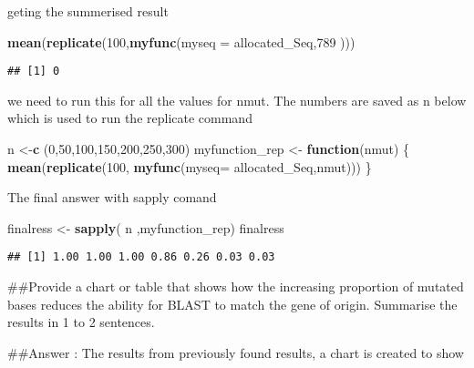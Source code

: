 \documentclass[]{article}
\newenvironment{Shaded}{\begin{snugshade}}{\end{snugshade}}
\newcommand{\ControlFlowTok}[1]{\textcolor[rgb]{0.13,0.29,0.53}{\textbf{#1}}}
\newcommand{\DataTypeTok}[1]{\textcolor[rgb]{0.13,0.29,0.53}{#1}}
\newcommand{\DecValTok}[1]{\textcolor[rgb]{0.00,0.00,0.81}{#1}}
\newcommand{\KeywordTok}[1]{\textcolor[rgb]{0.13,0.29,0.53}{\textbf{#1}}}
\newcommand{\NormalTok}[1]{#1}
\newcommand{\StringTok}[1]{\textcolor[rgb]{0.31,0.60,0.02}{#1}}
\begin{document}
geting the summerised result

\begin{Shaded}
\begin{Highlighting}[]
\KeywordTok{mean}\NormalTok{(}\KeywordTok{replicate}\NormalTok{(}\DecValTok{100}\NormalTok{,}\KeywordTok{myfunc}\NormalTok{(}\DataTypeTok{myseq =}\NormalTok{ allocated_Seq,}\DecValTok{789}\NormalTok{ )))}
\end{Highlighting}
\end{Shaded}

\begin{verbatim}
## [1] 0
\end{verbatim}

we need to run this for all the values for nmut. The numbers are saved
as n below which is used to run the replicate command

\begin{Shaded}
\begin{Highlighting}[]
\NormalTok{n <-}\KeywordTok{c}\NormalTok{ (}\DecValTok{0}\NormalTok{,}\DecValTok{50}\NormalTok{,}\DecValTok{100}\NormalTok{,}\DecValTok{150}\NormalTok{,}\DecValTok{200}\NormalTok{,}\DecValTok{250}\NormalTok{,}\DecValTok{300}\NormalTok{)}
\NormalTok{myfunction_rep <-}\StringTok{ }\ControlFlowTok{function}\NormalTok{(nmut) \{}
 \KeywordTok{mean}\NormalTok{(}\KeywordTok{replicate}\NormalTok{(}\DecValTok{100}\NormalTok{, }\KeywordTok{myfunc}\NormalTok{(}\DataTypeTok{myseq=}\NormalTok{ allocated_Seq,nmut)))}
\NormalTok{\}}
\end{Highlighting}
\end{Shaded}

The final answer with sapply comand

\begin{Shaded}
\begin{Highlighting}[]
\NormalTok{finalress <-}\StringTok{ }\KeywordTok{sapply}\NormalTok{( n ,myfunction_rep)}
\NormalTok{finalress}
\end{Highlighting}
\end{Shaded}

\begin{verbatim}
## [1] 1.00 1.00 1.00 0.86 0.26 0.03 0.03
\end{verbatim}

\#\#Provide a chart or table that shows how the increasing proportion of
mutated bases reduces the ability for BLAST to match the gene of origin.
Summarise the results in 1 to 2 sentences.

\#\#Answer : The results from previously found results, a chart is
created to show
\end{document}
